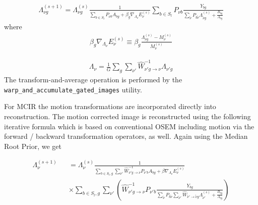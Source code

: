 \documentclass{article}
\begin{document}
\begin{equation}
\begin{array}{rrr}
\Lambda_{\nu g}^{(s+1)}=\Lambda_{\nu g}^{(s)}\frac{1}{ \sum\limits_{b\in S_{l}}P_{\nu b}A_{bg}+\beta_{g} \nabla_{\Lambda_{\nu}} E_{\nu}^{(s)}}\sum\limits_{b\in S_{l}}P_{\nu b}\frac{Y_{bg}}{\sum\limits_{\tilde{\nu}}P_{b\tilde{\nu}}\Lambda_{\tilde{\nu} g}^{(s)}+\frac{B_{bg}}{A_{bg}}}
\end{array}
\end{equation}
\noindent where
\begin{equation}
\begin{array}{rrr}
\beta_{g} \nabla_{\Lambda_{\nu}} E_{\nu}^{(s)} \equiv \beta_{g}\frac{\Lambda_{{\nu}g}^{(s)}-M_{{\nu}}^{(s)}}{M_{{\nu}}^{(s)}}
\end{array}
\end{equation}

\begin{equation}
\begin{array}{rrr}
\Lambda_{\nu}=\frac{1}{G}\sum\limits_{g}\sum\limits_{\nu'}\hat{W}^{-1} _{\nu'g\rightarrow \nu}\Lambda_{\nu'g}
\end{array}
\end{equation}
The transform-and-average operation is performed by the
\texttt{warp\_and\_accumulate\_gated\_images} utility.

For MCIR the motion transformations are incorporated directly into reconstruction. The motion corrected
image is reconstructed using the following iterative formula which is based on conventional OSEM
including motion via the forward / backward transformation operators, as well. Again using the Median Root Prior, we get

\begin{equation}
\begin{array}{lcl}
\Lambda_{\nu}^{(s+1)}&&=\Lambda_{\nu}^{(s)} \frac{1}{ \sum\limits_{b\in S_{l}, g} \sum\limits_{\nu'} \hat{W}^{-1} _{\nu'g\rightarrow \nu}P_{\nu' b}A_{bg}+\beta \nabla_{\Lambda_{\nu}} E_{\nu}^{(s)}}\\
&&\times \sum\limits_{b\in S_{l}, g} \sum\limits_{\nu'}\left(\hat{W}^{-1} _{\nu'g\rightarrow \nu}P_{\nu' b}\frac{Y_{bg}}{\sum\limits_{\tilde{\nu}}P_{b\tilde{\nu}}\sum\limits_{\tilde{\nu}'}\hat{W} _{\tilde{\nu}'\rightarrow \tilde{\nu}g}\Lambda_{\tilde{\nu}'}^{(s)}+\frac{B_{bg}}{A_{bg}}}\right)
\end{array}
\end{equation}
\end{document}
